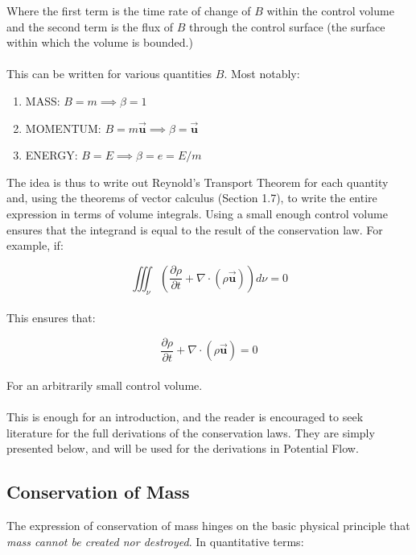 \documentclass[11pt]{article}
\begin{document}
\noindent
Where the first term is the time rate of change of $B$ within the control volume and the second term is the flux of $B$ through the control surface (the surface within which the volume is bounded.) \\ \\
This can be written for various quantities $B$. Most notably:
\begin{enumerate}
    \item MASS: $B = m \implies \beta = 1$ \\
    \item MOMENTUM: $B = m\vec{\bm{u}} \implies \beta = \vec{\bm{u}}$ \\
    \item ENERGY: $B = E \implies \beta = e = E/m$ \\
\end{enumerate}
The idea is thus to write out Reynold's Transport Theorem for each quantity and, using the theorems of vector calculus (Section 1.7), to write the entire expression in terms of volume integrals. Using a small enough control volume ensures that the integrand is equal to the result of the conservation law. For example, if:

\begin{equation*}
    \iiint_{\nu}\left(\frac{\partial\rho}{\partial t} + \nabla \cdot (\rho\vec{\bm{u}})\right)d\nu = 0
\end{equation*}\\
\noindent
This ensures that:

\begin{equation*}
    \frac{\partial\rho}{\partial t} + \nabla \cdot (\rho\vec{\bm{u}}) = 0
\end{equation*}\\
\noindent
For an arbitrarily small control volume.\\ \\
\noindent
This is enough for an introduction, and the reader is encouraged to seek literature for the full derivations of the conservation laws. They are simply presented below, and will be used for the derivations in Potential Flow.

\subsection{Conservation of Mass}
The expression of conservation of mass hinges on the basic physical principle that \emph{mass cannot be created nor destroyed}. In quantitative terms:
\end{document}

